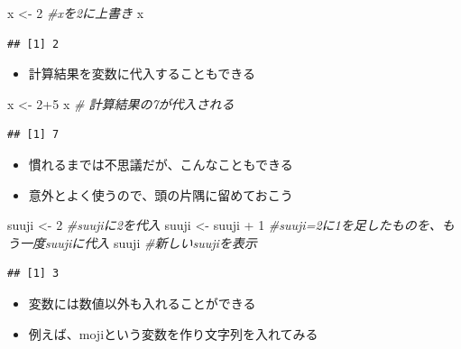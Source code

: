 \documentclass[
]{book}
\newenvironment{Shaded}{\begin{snugshade}}{\end{snugshade}}
\newcommand{\CommentTok}[1]{\textcolor[rgb]{0.56,0.35,0.01}{\textit{#1}}}
\newcommand{\DecValTok}[1]{\textcolor[rgb]{0.00,0.00,0.81}{#1}}
\newcommand{\NormalTok}[1]{#1}
\newcommand{\OtherTok}[1]{\textcolor[rgb]{0.56,0.35,0.01}{#1}}
\newcommand{\SpecialCharTok}[1]{\textcolor[rgb]{0.00,0.00,0.00}{#1}}
\providecommand{\tightlist}{%
  \setlength{\itemsep}{0pt}\setlength{\parskip}{0pt}}
\begin{document}
\begin{Shaded}
\begin{Highlighting}[]
\NormalTok{x }\OtherTok{\textless{}{-}} \DecValTok{2} \CommentTok{\#xを2に上書き}
\NormalTok{x}
\end{Highlighting}
\end{Shaded}

\begin{verbatim}
## [1] 2
\end{verbatim}

\begin{itemize}
\tightlist
\item
  計算結果を変数に代入することもできる
\end{itemize}

\begin{Shaded}
\begin{Highlighting}[]
\NormalTok{x }\OtherTok{\textless{}{-}} \DecValTok{2}\SpecialCharTok{+}\DecValTok{5} 
\NormalTok{x }\CommentTok{\# 計算結果の7が代入される}
\end{Highlighting}
\end{Shaded}

\begin{verbatim}
## [1] 7
\end{verbatim}

\begin{itemize}
\tightlist
\item
  慣れるまでは不思議だが、こんなこともできる
\item
  意外とよく使うので、頭の片隅に留めておこう
\end{itemize}

\begin{Shaded}
\begin{Highlighting}[]
\NormalTok{suuji }\OtherTok{\textless{}{-}} \DecValTok{2} \CommentTok{\#suujiに2を代入}
\NormalTok{suuji }\OtherTok{\textless{}{-}}\NormalTok{ suuji }\SpecialCharTok{+} \DecValTok{1} \CommentTok{\#suuji=2に1を足したものを、もう一度suujiに代入}
\NormalTok{suuji }\CommentTok{\#新しいsuujiを表示}
\end{Highlighting}
\end{Shaded}

\begin{verbatim}
## [1] 3
\end{verbatim}

\begin{itemize}
\tightlist
\item
  変数には数値以外も入れることができる
\item
  例えば、mojiという変数を作り文字列を入れてみる
\end{itemize}
\end{document}
